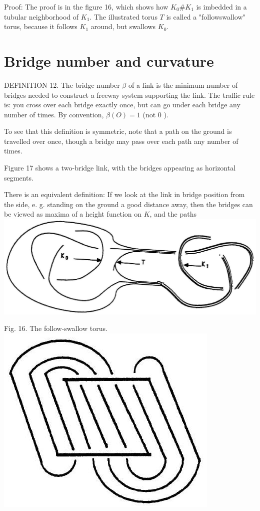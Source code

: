\documentclass[10pt, letterpaper]{article}
\begin{document}
Proof: The proof is in the figure 16, which shows how $K_{0} \# K_{1}$ is imbedded in a tubular neighborhood of $K_{1}$. The illustrated torus $T$ is called a "followswallow" torus, because it follows $K_{1}$ around, but swallows $K_{0}$.


\section{Bridge number and curvature}

DEFINITION 12. The bridge number $\beta$ of a link is the minimum number of bridges needed to construct a freeway system supporting the link. The traffic rule is: you cross over each bridge exactly once, but can go under each bridge any number of times. By convention, $\beta(O)=1$ (not 0 ).

To see that this definition is symmetric, note that a path on the ground is travelled over once, though a bridge may pass over each path any number of times.

Figure 17 shows a two-bridge link, with the bridges appearing as horizontal segments.

There is an equivalent definition: If we look at the link in bridge position from the side, e. g. standing on the ground a good distance away, then the bridges can be viewed as maxima of a height function on $K$, and the paths\\
\includegraphics[scale=0.2, center]{2025_05_21_037de704f595ce642d3eg-087(1)}

Fig. 16. The follow-swallow torus.\\
\includegraphics[scale=0.2, center]{2025_05_21_037de704f595ce642d3eg-087}
\end{document}
